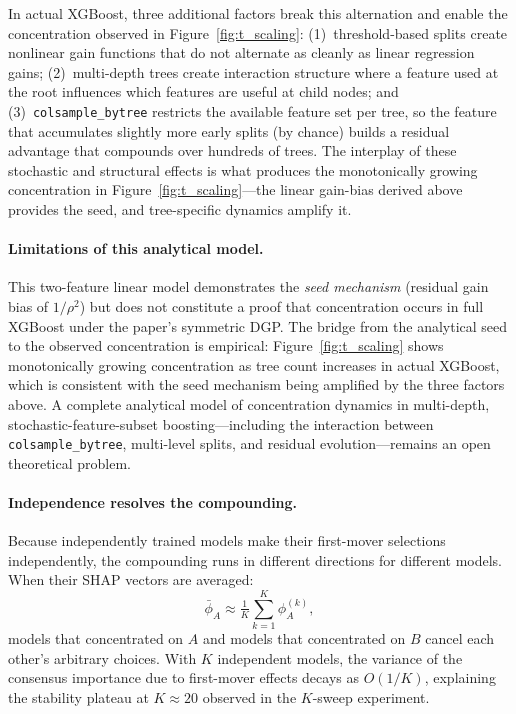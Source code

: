 \documentclass[11pt]{article}
\begin{document}
In actual XGBoost, three additional factors break this alternation and
enable the concentration observed in Figure~\ref{fig:t_scaling}:
(1)~threshold-based splits create nonlinear gain functions that do not
alternate as cleanly as linear regression gains;
(2)~multi-depth trees create interaction structure where a feature used
at the root influences which features are useful at child nodes; and
(3)~\texttt{colsample\_bytree} restricts the available feature set per
tree, so the feature that accumulates slightly more early splits
(by chance) builds a residual advantage that compounds over hundreds
of trees.  The interplay of these stochastic and structural effects is
what produces the monotonically growing concentration in
Figure~\ref{fig:t_scaling}---the linear gain-bias derived above provides
the seed, and tree-specific dynamics amplify it.

\paragraph{Limitations of this analytical model.}
This two-feature linear model demonstrates the \emph{seed mechanism}
(residual gain bias of $1/\rho^2$) but does not constitute a proof
that concentration occurs in full XGBoost under the paper's symmetric
DGP.  The bridge from the analytical seed to the observed concentration
is empirical: Figure~\ref{fig:t_scaling} shows monotonically growing
concentration as tree count increases in actual XGBoost, which is
consistent with the seed mechanism being amplified by the three factors
above.  A complete analytical model of concentration dynamics in
multi-depth, stochastic-feature-subset boosting---including the
interaction between \texttt{colsample\_bytree}, multi-level splits, and
residual evolution---remains an open theoretical problem.

\paragraph{Independence resolves the compounding.}
Because independently trained models make their first-mover selections
independently, the compounding runs in different directions for different
models.  When their SHAP vectors are averaged:
\begin{equation}
  \bar{\phi}_A \approx \tfrac{1}{K}\sum_{k=1}^{K} \phi_A^{(k)},
\end{equation}
models that concentrated on $A$ and models that concentrated on $B$
cancel each other's arbitrary choices. With $K$ independent models, the
variance of the consensus importance due to first-mover effects decays
as $O(1/K)$, explaining the stability plateau at $K \approx 20$
observed in the $K$-sweep experiment.
\end{document}
